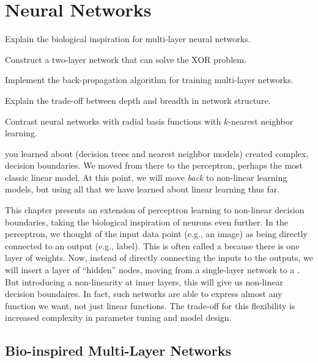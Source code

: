 \chapter{Neural Networks} \label{sec:nnet}


\begin{learningobjectives}
\item Explain the biological inspiration for multi-layer neural
  networks.
\item Construct a two-layer network that can solve the XOR problem.
\item Implement the back-propagation algorithm for training
  multi-layer networks.
\item Explain the trade-off between depth and breadth in network
  structure.
\item Contrast neural networks with radial basis functions with
  $k$-nearest neighbor learning.
\end{learningobjectives}

\dependencies{}

 you learned about (decision
trees and nearest neighbor models) created complex,
 decision boundaries.  We moved from there to the
perceptron, perhaps the most classic linear model.  At this point, we
will move \emph{back} to non-linear learning models, but using all
that we have learned about linear learning thus far.

This chapter presents an extension of perceptron learning to
non-linear decision boundaries, taking the biological inspiration of
neurons even further.  In the perceptron, we thought of the input data
point (e.g., an image) as being directly connected to an output (e.g.,
label).  This is often called a  because
there is one layer of weights.  Now, instead of directly connecting
the inputs to the outputs, we will insert a layer of ``hidden'' nodes,
moving from a single-layer network to a .
But introducing a non-linearity at inner layers, this will give us
non-linear decision boundaires.  In fact, such networks are able to
express almost any function we want, not just linear functions.  The
trade-off for this flexibility is increased complexity in parameter
tuning and model design.

\section{Bio-inspired Multi-Layer Networks}

